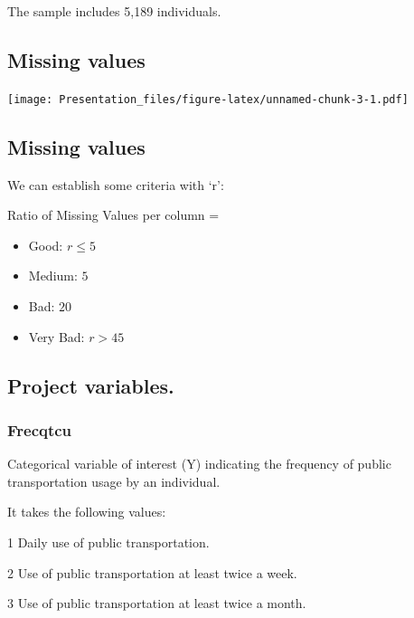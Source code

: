 \documentclass[
]{article}
\begin{document}
The sample includes 5,189 individuals.

\hypertarget{missing-values}{%
\subsection{Missing values}\label{missing-values}}

\texttt{[image: Presentation\_files/figure-latex/unnamed-chunk-3-1.pdf]}

\hypertarget{missing-values-1}{%
\subsection{Missing values}\label{missing-values-1}}

We can establish some criteria with `r':

Ratio of Missing Values per column =

\begin{itemize}
\item
  Good: \(r \leq 5%
  \)
\item
  Medium: \(5%
  \)
\item
  Bad: \(20%
  \)
\item
  Very Bad: \(r > 45%
  \)
\end{itemize}

\hypertarget{project-variables.}{%
\subsection{Project variables.}\label{project-variables.}}

\hypertarget{frecqtcu}{%
\subsubsection{Frecqtcu}\label{frecqtcu}}

Categorical variable of interest (Y) indicating the frequency of public
transportation usage by an individual.\newline 

It takes the following values: \newline

1\textbar{} Daily use of public transportation.

2\textbar{} Use of public transportation at least twice a week.

3\textbar{} Use of public transportation at least twice a month.
\end{document}
